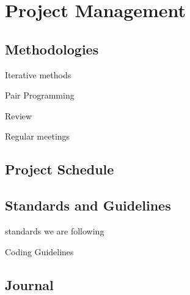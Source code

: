 \part{Project Management}
\chapter{Methodologies}

Iterative methods

Pair Programming

Review

Regular meetings

\chapter{Project Schedule}
\begin{landscape}
  \begin{gantt}{12}{16}
    \begin{ganttitle}
    \end{ganttitle}
  \end{gantt}
\end{landscape}

\chapter{Standards and Guidelines}

standards we are following

Coding Guidelines

\chapter{Journal}
